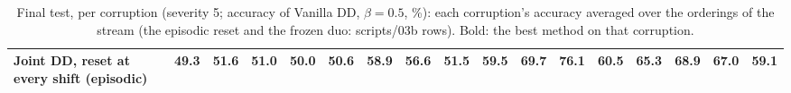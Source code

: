 \begin{table}[t]
{\begin{tabular}{@{}lrrrrrrrrrrrrrrrr@{}}
    Joint DD, reset at every shift (episodic) & \textbf{49.3} & \textbf{51.6} & \textbf{51.0} & \textbf{50.0} & \textbf{50.6} & \textbf{58.9} & \textbf{56.6} & 51.5 & \textbf{59.5} & \textbf{69.7} & \textbf{76.1} & \textbf{60.5} & \textbf{65.3} & \textbf{68.9} & \textbf{67.0} & 59.1 \\
    \bottomrule
  \end{tabular}}
  \caption{Final test, per corruption (severity 5; accuracy of Vanilla DD, $\beta=0.5$, \%): each corruption's accuracy averaged over the orderings of the stream (the episodic reset and the frozen duo: scripts/03b rows). Bold: the best method on that corruption.}
  \label{tab:final_per_shift}
\end{table}

